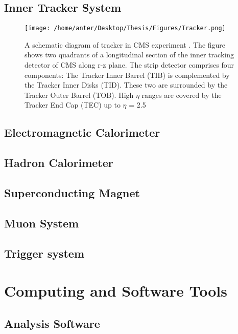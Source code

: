 \subsection{Inner Tracker System}

\begin{figure}[!h]
\begin{center} 
\hspace*{-15mm}
\texttt{[image: /home/anter/Desktop/Thesis/Figures/Tracker.png]}
\caption{A schematic diagram of tracker in CMS experiment \cite{Chatrchyan:2008aa}. The figure shows
two quadrants of a longitudinal section of the inner tracking detector of CMS along r-z
plane. The strip detector comprises four components: The Tracker Inner Barrel (TIB)
is complemented by the Tracker Inner Disks (TID). These two are surrounded by the
Tracker Outer Barrel (TOB). High $\eta$ ranges are covered by the Tracker End Cap (TEC)
up to $\eta$ = 2.5}
\label{fig:Trcaker}
\end{center}
\end{figure}

\subsection{Electromagnetic Calorimeter}

\subsection{Hadron Calorimeter}

\subsection{Superconducting Magnet}

\subsection{Muon System}

\subsection{Trigger system}

\section{Computing and Software Tools}

\subsection{Analysis Software}

